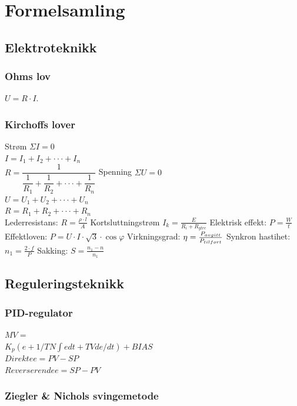 \documentclass[10pt,a5paper]{article}
\begin{document}
\section{Formelsamling}

\subsection{Elektroteknikk}
\vskip 2.5pt
\subsubsection*{Ohms lov}
\vskip 2.5pt
$U=R\cdot I$.
\vskip 2.5pt
\subsubsection*{Kirchoffs lover}
\vskip 2.5pt  
Strøm $\Sigma I=0$\\
\vskip 2.5pt  
$I=I_{1}+I_{2}+\cdot\cdot\cdot+I_{n}$\\
\vskip 2.5pt  
$R=\dfrac{1}{\dfrac{1}{R_{1}}+\dfrac{1}{R_{2}}+\cdot\cdot\cdot+\dfrac{1}{R_{n}}}$
\vskip 2pt
 Spenning $\Sigma U=0$\\
\vskip 2.5pt  
$U=U_{1}+U_{2}+\cdot\cdot\cdot+U_{n}$\\
\vskip 2.5pt  
$R=R_{1}+R_{2}+\cdot\cdot\cdot+R_{n}$\\
\vskip 2pt
Lederresistans: $ R=\frac{\rho\cdot l}{A}$ 
\vskip 2pt
Kortsluttningstrøm $I_{k}=\frac{E}{R_{i}+R_{ytre}}$
\vskip 2pt
Elektrisk effekt: $P=\frac{W}{t}$
\vskip 2pt  
Effektloven: $P=U\cdot I\cdot \sqrt{3} \cdot \cos \varphi$
\vskip 2.5pt  
Virkningsgrad: $\eta=\frac{P_{avgitt}}{P_{tilf\\ort}}$
\vskip 2.5pt
Synkron hastihet: $n_1=\frac{2\cdot f}{P}$
\vskip 2.5pt 
Sakking: $S=\frac{n_1-n}{n_1}$
\vskip 2.5pt 
\subsection{Reguleringsteknikk}
\vskip 2.5pt 
\subsubsection*{PID-regulator}
$MV=$\\
$K_p(e+1/TN \int e dt + TV de/dt)+BIAS$\\
\vskip 2.5pt
$Direkte e=PV-SP$\\
$Reverserende e=SP-PV$\\
\subsubsection*{Ziegler \& Nichols svingemetode}
\end{document}
